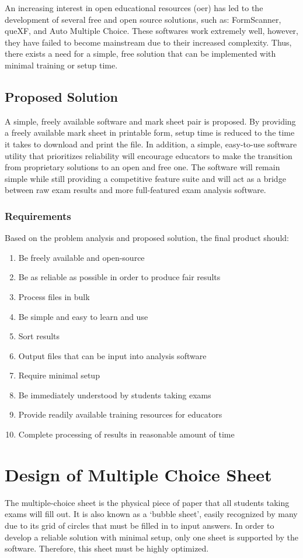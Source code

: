 \documentclass[12pt, letterpaper]{report}
\begin{document}
An increasing interest in open educational resources (\ac{oer}) has led to the
development of several free and open source solutions, such as: FormScanner,
queXF, and Auto Multiple Choice. These softwares work extremely well, however,
they have failed to become mainstream due to their increased complexity. Thus,
there exists a need for a simple, free solution that can be implemented with
minimal training or setup time.
\section{Proposed Solution}
A simple, freely available software and mark sheet pair is proposed. By
providing a freely available mark sheet in printable form, setup time is reduced
to the time it takes to download and print the file. In addition, a simple,
easy-to-use software utility that prioritizes reliability will encourage
educators to make the transition from proprietary solutions to an open and free
one. The software will remain simple while still providing a competitive feature
suite and will act as a bridge between raw exam results and more full-featured
exam analysis software.
\subsection{Requirements}
Based on the problem analysis and proposed solution, the final product should:

\begin{enumerate}
  \item Be freely available and open-source
  \item Be as reliable as possible in order to produce fair results
  \item Process files in bulk
  \item Be simple and easy to learn and use
  \item Sort results
  \item Output files that can be input into analysis software
  \item Require minimal setup
  \item Be immediately understood by students taking exams
  \item Provide readily available training resources for educators
  \item Complete processing of results in reasonable amount of time
\end{enumerate}

\chapter{Design of Multiple Choice Sheet}
The multiple-choice sheet is the physical piece of paper that all students
taking exams will fill out. It is also known as a `bubble sheet', easily recognized
by many due to its grid of circles that must be filled in to input answers. In order to
develop a reliable solution with minimal setup, only one sheet is supported
by the software. Therefore, this sheet must be highly optimized.
\end{document}
